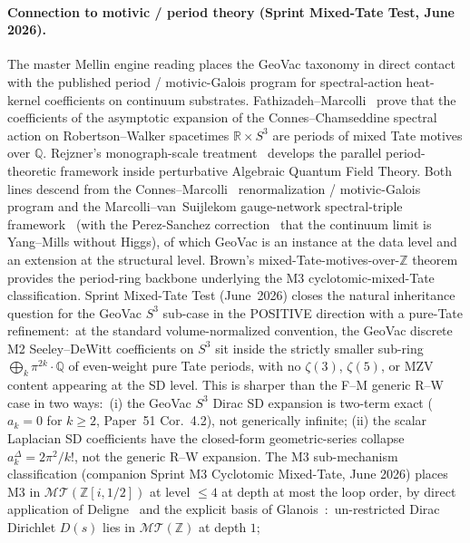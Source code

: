 \documentclass[aps,pra,twocolumn,superscriptaddress,longbibliography]{revtex4-2}
\begin{document}
\paragraph{Connection to motivic / period theory (Sprint Mixed-Tate
Test, June 2026).}
The master Mellin engine reading places the GeoVac taxonomy in
direct contact with the published period / motivic-Galois program
for spectral-action heat-kernel coefficients on continuum
substrates. Fathizadeh--Marcolli~\cite{fathizadeh_marcolli2016}
prove that the coefficients of the asymptotic expansion of the
Connes--Chamseddine spectral action on Robertson--Walker spacetimes
$\mathbb{R} \times S^3$ are periods of mixed Tate motives over
$\mathbb{Q}$. Rejzner's monograph-scale
treatment~\cite{rejzner2016} develops the parallel
period-theoretic framework inside perturbative Algebraic Quantum
Field Theory. Both lines descend from the
Connes--Marcolli~\cite{connes_marcolli2004} renormalization /
motivic-Galois program and the Marcolli--van~Suijlekom gauge-network
spectral-triple framework~\cite{marcolli_vs2014} (with the
Perez-Sanchez correction~\cite{perez_sanchez2024,perez_sanchez2025}
that the continuum limit is Yang--Mills without Higgs), of which
GeoVac is an instance at the data level and an extension at the
structural level.  Brown's mixed-Tate-motives-over-$\mathbb{Z}$
theorem~\cite{brown2012} provides the period-ring backbone
underlying the M3 cyclotomic-mixed-Tate classification. Sprint Mixed-Tate Test (June~2026) closes the natural
inheritance question for the GeoVac $S^3$ sub-case in the POSITIVE
direction with a pure-Tate refinement:\ at the standard
volume-normalized convention, the GeoVac discrete M2 Seeley--DeWitt
coefficients on $S^3$ sit inside the strictly smaller sub-ring
$\bigoplus_k \pi^{2k}\cdot\mathbb{Q}$ of even-weight pure Tate
periods, with no $\zeta(3)$, $\zeta(5)$, or MZV content appearing
at the SD level. This is sharper than the F--M generic R--W case
in two ways:\ (i) the GeoVac $S^3$ Dirac SD expansion is two-term
exact ($a_k = 0$ for $k \ge 2$, Paper~51 Cor.~4.2), not generically
infinite; (ii) the scalar Laplacian SD coefficients have the
closed-form geometric-series collapse $a_k^\Delta = 2\pi^2/k!$,
not the generic R--W expansion. The M3 sub-mechanism
classification (companion Sprint M3 Cyclotomic Mixed-Tate, June
2026) places
M3 in $\mathcal{MT}(\mathbb{Z}[i, 1/2])$ at level $\le 4$ at depth
at most the loop order, by direct application of
Deligne~\cite{deligne2010} and the explicit basis of
Glanois~\cite{glanois2015}:\ un-restricted Dirac Dirichlet
$D(s)$ lies in $\mathcal{MT}(\mathbb{Z})$ at depth $1$;
\end{document}
